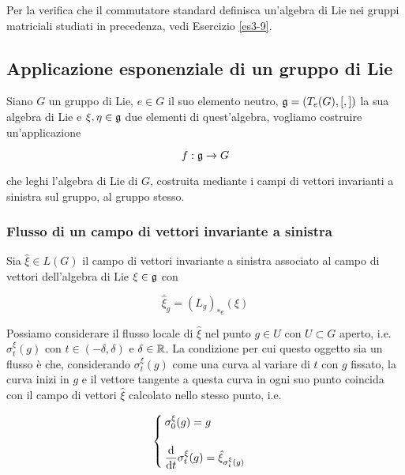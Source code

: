 Per la verifica che il commutatore standard definisca un'algebra di Lie nei gruppi matriciali studiati in precedenza, vedi Esercizio \ref{es3-9}.

\subsection{Applicazione esponenziale di un gruppo di Lie}

Siano $ G $ un gruppo di Lie, $ e \in G $ il suo elemento neutro, $ \mathfrak{g} = (T_{e}(G),[,]) $ la sua algebra di Lie e $ \xi,\eta \in \mathfrak{g} $ due elementi di quest'algebra, vogliamo costruire un'applicazione

\begin{equation}
	f : \mathfrak{g} \to G
\end{equation}

che leghi l'algebra di Lie di $ G $, costruita mediante i campi di vettori invarianti a sinistra sul gruppo, al gruppo stesso.

\subsubsection{Flusso di un campo di vettori invariante a sinistra}

Sia $ \hat{\xi} \in L(G) $ il campo di vettori invariante a sinistra associato al campo di vettori dell'algebra di Lie $ \xi \in \mathfrak{g} $ con

\begin{equation}
	\hat{\xi}_{g} = (L_{g})_{*e}(\xi)
\end{equation}

Possiamo considerare il flusso locale di $ \hat{\xi} $ nel punto $ g \in U $ con $ U \subset G $ aperto, i.e. $ \sigma_{t}^{\xi}(g) $ con $ t \in (-\delta,\delta) $ e $ \delta \in \mathbb{R} $. La condizione per cui questo oggetto sia un flusso è che, considerando $ \sigma_{t}^{\xi}(g) $ come una curva al variare di $ t $ con $ g $ fissato, la curva inizi in $ g $ e il vettore tangente a questa curva in ogni suo punto coincida con il campo di vettori $ \hat{\xi} $ calcolato nello stesso punto, i.e.

\begin{equation}
	\begin{cases}
		\sigma_{0}^{\xi}(g) = g \\\\
		\ddv{t} \sigma_{t}^{\xi}(g) = \hat{\xi}_{\sigma_{t}^{\xi}(g)}
	\end{cases}
\end{equation}

